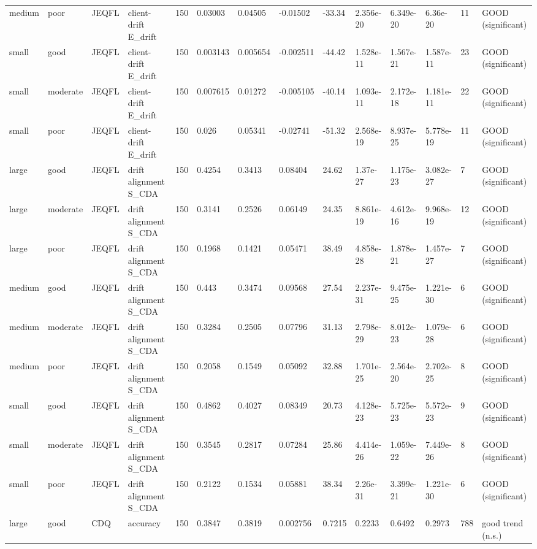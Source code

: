 \begin{table}[t]
\begin{tabular}{llllllllllllll}
medium & poor & JEQFL & client-drift E\_drift & 150 & 0.03003 & 0.04505 & -0.01502 & -33.34 & 2.356e-20 & 6.349e-20 & 6.36e-20 & 11 & GOOD (significant) \\
small & good & JEQFL & client-drift E\_drift & 150 & 0.003143 & 0.005654 & -0.002511 & -44.42 & 1.528e-11 & 1.567e-21 & 1.587e-11 & 23 & GOOD (significant) \\
small & moderate & JEQFL & client-drift E\_drift & 150 & 0.007615 & 0.01272 & -0.005105 & -40.14 & 1.093e-11 & 2.172e-18 & 1.181e-11 & 22 & GOOD (significant) \\
small & poor & JEQFL & client-drift E\_drift & 150 & 0.026 & 0.05341 & -0.02741 & -51.32 & 2.568e-19 & 8.937e-25 & 5.778e-19 & 11 & GOOD (significant) \\
large & good & JEQFL & drift alignment S\_CDA & 150 & 0.4254 & 0.3413 & 0.08404 & 24.62 & 1.37e-27 & 1.175e-23 & 3.082e-27 & 7 & GOOD (significant) \\
large & moderate & JEQFL & drift alignment S\_CDA & 150 & 0.3141 & 0.2526 & 0.06149 & 24.35 & 8.861e-19 & 4.612e-16 & 9.968e-19 & 12 & GOOD (significant) \\
large & poor & JEQFL & drift alignment S\_CDA & 150 & 0.1968 & 0.1421 & 0.05471 & 38.49 & 4.858e-28 & 1.878e-21 & 1.457e-27 & 7 & GOOD (significant) \\
medium & good & JEQFL & drift alignment S\_CDA & 150 & 0.443 & 0.3474 & 0.09568 & 27.54 & 2.237e-31 & 9.475e-25 & 1.221e-30 & 6 & GOOD (significant) \\
medium & moderate & JEQFL & drift alignment S\_CDA & 150 & 0.3284 & 0.2505 & 0.07796 & 31.13 & 2.798e-29 & 8.012e-23 & 1.079e-28 & 6 & GOOD (significant) \\
medium & poor & JEQFL & drift alignment S\_CDA & 150 & 0.2058 & 0.1549 & 0.05092 & 32.88 & 1.701e-25 & 2.564e-20 & 2.702e-25 & 8 & GOOD (significant) \\
small & good & JEQFL & drift alignment S\_CDA & 150 & 0.4862 & 0.4027 & 0.08349 & 20.73 & 4.128e-23 & 5.725e-23 & 5.572e-23 & 9 & GOOD (significant) \\
small & moderate & JEQFL & drift alignment S\_CDA & 150 & 0.3545 & 0.2817 & 0.07284 & 25.86 & 4.414e-26 & 1.059e-22 & 7.449e-26 & 8 & GOOD (significant) \\
small & poor & JEQFL & drift alignment S\_CDA & 150 & 0.2122 & 0.1534 & 0.05881 & 38.34 & 2.26e-31 & 3.399e-21 & 1.221e-30 & 6 & GOOD (significant) \\
large & good & CDQ & accuracy & 150 & 0.3847 & 0.3819 & 0.002756 & 0.7215 & 0.2233 & 0.6492 & 0.2973 & 788 & good trend (n.s.) \\

\end{tabular}
\end{table}
